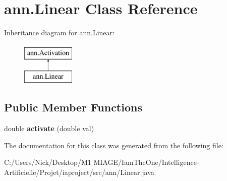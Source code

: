 \hypertarget{classann_1_1_linear}{}\section{ann.\+Linear Class Reference}
\label{classann_1_1_linear}
Inheritance diagram for ann.\+Linear\+:\begin{figure}[H]
\begin{center}
\leavevmode
\includegraphics[height=2.000000cm]{classann_1_1_linear}
\end{center}
\end{figure}
\subsection*{Public Member Functions}
\begin{DoxyCompactItemize}
\item 
\mbox{\label{classann_1_1_linear_ae68f09cd9d9fc93ac9c00f61730b82fb}} 
double {\bfseries activate} (double val)
\end{DoxyCompactItemize}


The documentation for this class was generated from the following file\+:\begin{DoxyCompactItemize}
\item 
C\+:/\+Users/\+Nick/\+Desktop/\+M1 M\+I\+A\+G\+E/\+Iam\+The\+One/\+Intelligence-\/\+Artificielle/\+Projet/iaproject/src/ann/Linear.\+java\end{DoxyCompactItemize}
